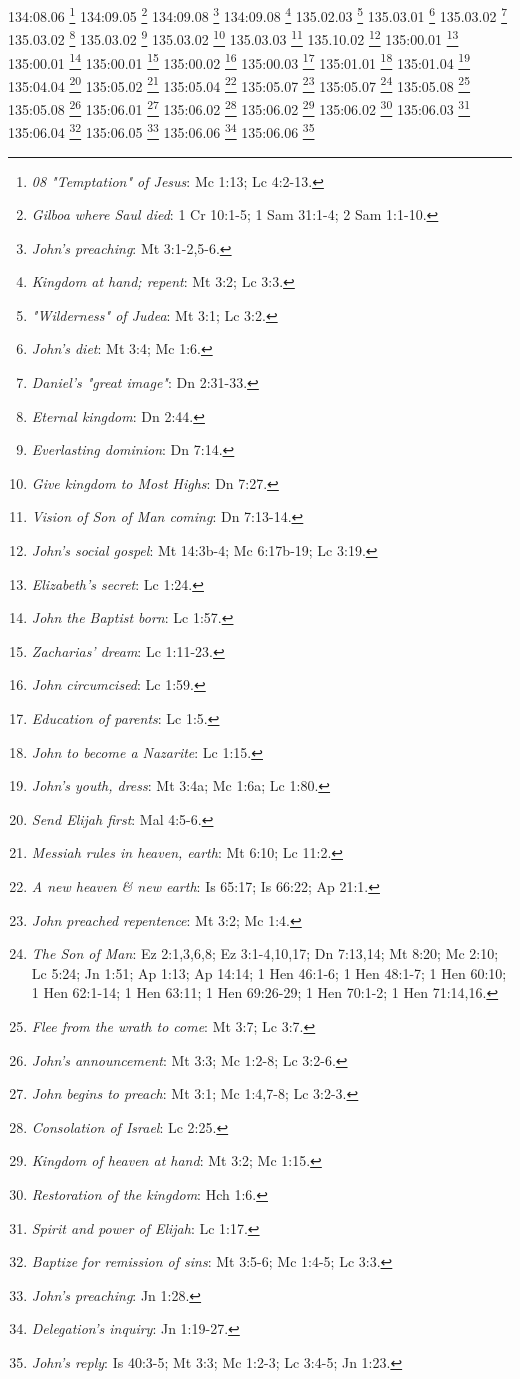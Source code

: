{{{{{{{{{{{134:08.06 \footnote{\textit{08 "Temptation" of Jesus}: Mc 1:13; Lc 4:2-13.}
134:09.05 \footnote{\textit{Gilboa where Saul died}: 1 Cr 10:1-5; 1 Sam 31:1-4; 2 Sam 1:1-10.}
134:09.08 \footnote{\textit{John's preaching}: Mt 3:1-2,5-6.}
134:09.08 \footnote{\textit{Kingdom at hand; repent}: Mt 3:2; Lc 3:3.}
135.02.03 \footnote{\textit{"Wilderness" of Judea}: Mt 3:1; Lc 3:2.}
135.03.01 \footnote{\textit{John's diet}: Mt 3:4; Mc 1:6.}
135.03.02 \footnote{\textit{Daniel's "great image"}: Dn 2:31-33.}
135.03.02 \footnote{\textit{Eternal kingdom}: Dn 2:44.}
135.03.02 \footnote{\textit{Everlasting dominion}: Dn 7:14.}
135.03.02 \footnote{\textit{Give kingdom to Most Highs}: Dn 7:27.}
135.03.03 \footnote{\textit{Vision of Son of Man coming}: Dn 7:13-14.}
135.10.02 \footnote{\textit{John's social gospel}: Mt 14:3b-4; Mc 6:17b-19; Lc 3:19.}
135:00.01 \footnote{\textit{Elizabeth's secret}: Lc 1:24.}
135:00.01 \footnote{\textit{John the Baptist born}: Lc 1:57.}
135:00.01 \footnote{\textit{Zacharias' dream}: Lc 1:11-23.}
135:00.02 \footnote{\textit{John circumcised}: Lc 1:59.}
135:00.03 \footnote{\textit{Education of parents}: Lc 1:5.}
135:01.01 \footnote{\textit{John to become a Nazarite}: Lc 1:15.}
135:01.04 \footnote{\textit{John's youth, dress}: Mt 3:4a; Mc 1:6a; Lc 1:80.}
135:04.04 \footnote{\textit{Send Elijah first}: Mal 4:5-6.}
135:05.02 \footnote{\textit{Messiah rules in heaven, earth}: Mt 6:10; Lc 11:2.}
135:05.04 \footnote{\textit{A new heaven & new earth}: Is 65:17; Is 66:22; Ap 21:1.}
135:05.07 \footnote{\textit{John preached repentence}: Mt 3:2; Mc 1:4.}
135:05.07 \footnote{\textit{The Son of Man}: Ez 2:1,3,6,8; Ez 3:1-4,10,17; Dn 7:13,14; Mt 8:20; Mc 2:10; Lc 5:24; Jn 1:51; Ap 1:13; Ap 14:14; 1 Hen 46:1-6; 1 Hen 48:1-7; 1 Hen 60:10; 1 Hen 62:1-14; 1 Hen 63:11; 1 Hen 69:26-29; 1 Hen 70:1-2; 1 Hen 71:14,16.}
135:05.08 \footnote{\textit{Flee from the wrath to come}: Mt 3:7; Lc 3:7.}
135:05.08 \footnote{\textit{John's announcement}: Mt 3:3; Mc 1:2-8; Lc 3:2-6.}
135:06.01 \footnote{\textit{John begins to preach}: Mt 3:1; Mc 1:4,7-8; Lc 3:2-3.}
135:06.02 \footnote{\textit{Consolation of Israel}: Lc 2:25.}
135:06.02 \footnote{\textit{Kingdom of heaven at hand}: Mt 3:2; Mc 1:15.}
135:06.02 \footnote{\textit{Restoration of the kingdom}: Hch 1:6.}
135:06.03 \footnote{\textit{Spirit and power of Elijah}: Lc 1:17.}
135:06.04 \footnote{\textit{Baptize for remission of sins}: Mt 3:5-6; Mc 1:4-5; Lc 3:3.}
135:06.05 \footnote{\textit{John's preaching}: Jn 1:28.}
135:06.06 \footnote{\textit{Delegation's inquiry}: Jn 1:19-27.}
135:06.06 \footnote{\textit{John's reply}: Is 40:3-5; Mt 3:3; Mc 1:2-3; Lc 3:4-5; Jn 1:23.}
}}}}}}}}}}}
